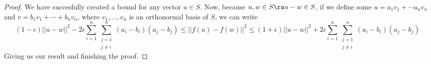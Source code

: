 \documentclass{article}
\begin{document}
\begin{proof}
    We have succesfully created a bound for any vector $u \in S$. Now, because 
    $u,w \in S \ra u - w \in S$, if we define some $u = a_1v_1 + \cdots a_{n}v_n$ and $v = b_1v_1 + \cdots + b_{n}v_n$,
    where $v_1,\ldots,v_n$ is an orthonormal basis of $S$, we can write
    \[(1-\epsilon)||u-w||^2- 2\epsilon\sum_{i=1}^{n}\sum_{\substack{j=1 \\ j \neq i}}^{n}(a_{i}-b_i)(a_{j}-b_j) \leq ||f(u) - f(w)||^2 \leq (1+\epsilon)||u - w||^2 + 2\epsilon\sum_{i=1}^{n}\sum_{\substack{j=1 \\ j \neq i}}^{n}(a_{i}-b_i)(a_{j}-b_j)\]
    Giving us our result and finishing the proof.
\end{proof}
\end{document}
